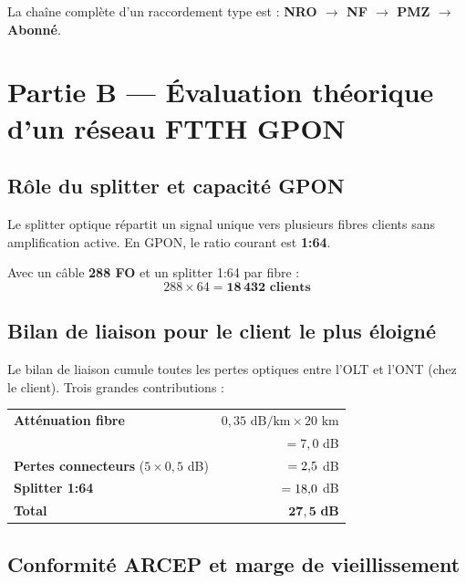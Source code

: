 \documentclass[11pt,a4paper]{article}
\begin{document}
La chaîne complète d'un raccordement type est : \textbf{NRO $\rightarrow$ NF $\rightarrow$ PMZ $\rightarrow$ Abonné}.

\section{Partie B — Évaluation théorique d'un réseau FTTH GPON}

\subsection{Rôle du splitter et capacité GPON}

Le splitter optique répartit un signal unique vers plusieurs fibres clients sans amplification active. En GPON, le ratio courant est \textbf{1:64}.

\begin{calcbox}[title={\faCalculator~Capacité maximale en GPON}]
Avec un câble \textbf{288 FO} et un splitter 1:64 par fibre :
\[
288 \times 64 = \mathbf{18\,432 \text{ clients}}
\]
\end{calcbox}

\subsection{Bilan de liaison pour le client le plus éloigné}

Le bilan de liaison cumule toutes les pertes optiques entre l'OLT et l'ONT (chez le client). Trois grandes contributions :

\begin{calcbox}[title={\faRuler~Bilan optique sur 20 km}]
\begin{tabular}{@{}l r@{}}
\textbf{Atténuation fibre}            & $0{,}35\text{ dB/km} \times 20\text{ km}$ \\
                                       & \hfill $= 7{,}0$ dB \\[2pt]
\textbf{Pertes connecteurs} ($5 \times 0{,}5$ dB) & $\hfill = 2{,}5$ dB \\[2pt]
\textbf{Splitter 1:64}                & $\hfill = 18{,}0$ dB \\[4pt]
\midrule
\textbf{Total}                        & \hfill $\mathbf{27{,}5}$ \textbf{dB} \\
\end{tabular}
\end{calcbox}

\subsection{Conformité ARCEP et marge de vieillissement}
\end{document}
